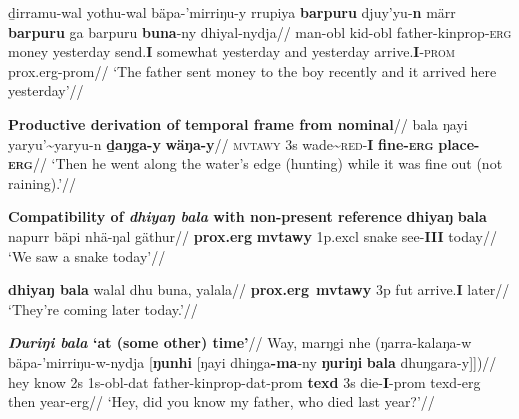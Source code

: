 \documentclass[11pt,dvipsnames]{article}
\begin{document}
\a	\begingl\gla ḏirramu-wal yothu-wal bäpa-'mirriŋu-y rrupiya \textbf{barpuru} djuy'yu-\textbf{n} märr \textbf{barpuru} ga barpuru \textbf{buna}-ny dhiyal-nydja//
\glb man-\gls{obl} kid-\gls{obl} father-\gls{kinprop}-\textsc{erg} money yesterday send.\textbf{I} somewhat yesterday and yesterday arrive.\textbf{I}-\textsc{prom} \gls{prox}.\gls{erg}-\gls{prom}//
\glft`The father sent money to the boy recently and it arrived here yesterday'//\endgl
\xe

\pex{}\begingl\glpreamble\textbf{Productive derivation of temporal frame from nominal}//
\gla bala ŋayi yaryu'\textasciitilde{yaryu}-n \textbf{ḏaŋga-y} \textbf{wäŋa-y}//
\glb \textsc{mvtawy} 3s wade\textasciitilde{\textsc{red}}-\textbf{I} \textbf{fine-\textsc{erg}} \textbf{place-\textsc{erg}}//
\glft`Then he went along the water's edge (hunting) while it was fine out (not raining).'//\endgl\xe


\pex\textbf{Compatibility of \textit{dhiyaŋ bala} with non-present reference}
\a\begingl\gla \textbf{dhiyaŋ} \textbf{bala} napurr bäpi nhä-ŋal gäthur//
\glb \textbf{\gls{prox}.\gls{erg}} \textbf{\gls{mvtawy}} 1p.\gls{excl} snake see-\textbf{III} today//
\glft`We saw a snake today'//\endgl

\a\begingl\gla \textbf{dhiyaŋ bala} walal dhu buna, yalala//
\glb \textbf{\gls{prox}.\gls{erg}}~\textbf{\gls{mvtawy}} 3p \gls{fut} arrive.\textbf{I} later//
\glft`They're coming later today.'//\endgl
\xe



\pex \begingl\glpreamble \textbf{\textit{Ŋuriŋi bala} `at (some other) time'}//
\gla Way, marŋgi nhe (ŋarra-kalaŋa-w bäpa-'mirriŋu-w-nydja [\textbf{ŋunhi} [ŋayi dhiŋga\textbf{-ma}-ny \textbf{ŋuriŋi} \textbf{bala} dhuŋgara-y]])//
\glb hey know 2s 1s-\gls{obl}-\gls{dat} father-\gls{kinprop}-\gls{dat}-\gls{prom} \textbf{\gls{texd}} 3s die-\textbf{I}-\gls{prom} \gls{texd}-\gls{erg} then year-\gls{erg}//
\glft`Hey, did you know my father, who died last year?'//\endgl\xe


\end{document}
